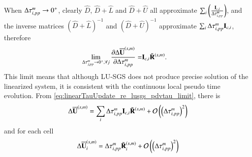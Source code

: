 When $\mathrm\Delta\tau^m_{i,pp}\rightarrow 0^+$, clearly 
$\hat D $, $\hat D + \hat L$ and $\hat D + \hat U$ all 
approximate
$\sum_i\left(\frac{\mathbf{I}_{c,i}}{\mathrm\Delta \tau^m_{i,pp}}\right) $,
and the inverse matrices  $(\hat D + \hat L)^{-1}$ and 
$(\hat D + \hat U)^{-1}$ approximate $\sum_i\mathrm\Delta\tau^m_{i,pp}\mathbf{I}_{c,i}$,
therefore
\begin{equation}
    \begin{aligned}
       \lim_{\mathrm\Delta\tau^m_{j,pp}\rightarrow 0^+, \forall j}\pdv{\mathrm\Delta\overline{\mathbf{U}}^{\left(s,m\right)}}{\mathrm\Delta\tau^m_{i,pp}}
    = & \mathbf{I}_{c,i}
    \tilde{\mathbf{R}}^{\left(s,m\right)}.
    \end{aligned}
    \label{eq:linearTauUpdate_re_lusgs_pdvtau_limit}
\end{equation}
This limit means that although LU-SGS does not 
produce precise solution of the linearized system, 
it is consistent with the continuous local pseudo time evolution. 
From \eqref{eq:linearTauUpdate_re_lusgs_pdvtau_limit},
there is 
\begin{equation}
    \mathrm\Delta \overline{\mathbf{U}}^{\left(s,m\right)}
    =
    \sum_i{\mathrm\Delta\tau^m_{i,pp}\mathbf{I}_{c,i}} \tilde{\mathbf{R}}^{\left(s,m\right)}
    +
    \mathcal{O}\left(\left(\mathrm\Delta\tau^m_{i,pp}\right)^2\right)
\end{equation}
and for each cell
\begin{equation}
\label{eq:linearTauUpdate_lusgs_expand_tau}
    \mathrm\Delta \overline{\mathbf{U}}^{\left(s,m\right)}_i
    =
    \mathrm\Delta\tau^m_{i,pp}
    \tilde{\mathbf{R}}^{\left(s,m\right)}_i
    +
    \mathcal{O}\left(\left(\mathrm\Delta\tau^m_{i,pp}\right)^2\right)
\end{equation}

